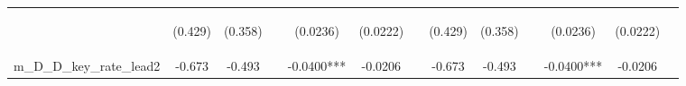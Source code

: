 \documentclass[]{article}
\begin{document}
\begin{center}
\begin{tabular}{lcccccccccccc}
\vspace{4pt} & \begin{footnotesize}(0.429)\end{footnotesize} & \begin{footnotesize}(0.358)\end{footnotesize} & \begin{footnotesize}\end{footnotesize} & \begin{footnotesize}(0.0236)\end{footnotesize} & \begin{footnotesize}(0.0222)\end{footnotesize} & \begin{footnotesize}\end{footnotesize} & \begin{footnotesize}(0.429)\end{footnotesize} & \begin{footnotesize}(0.358)\end{footnotesize} & \begin{footnotesize}\end{footnotesize} & \begin{footnotesize}(0.0236)\end{footnotesize} & \begin{footnotesize}(0.0222)\end{footnotesize} & \begin{footnotesize}\end{footnotesize} \\
m\_D\_D\_key\_rate\_lead2 & -0.673 & -0.493 &  & -0.0400*** & -0.0206 &  & -0.673 & -0.493 &  & -0.0400*** & -0.0206 &  \\

\end{tabular}
\end{center}
\end{document}
